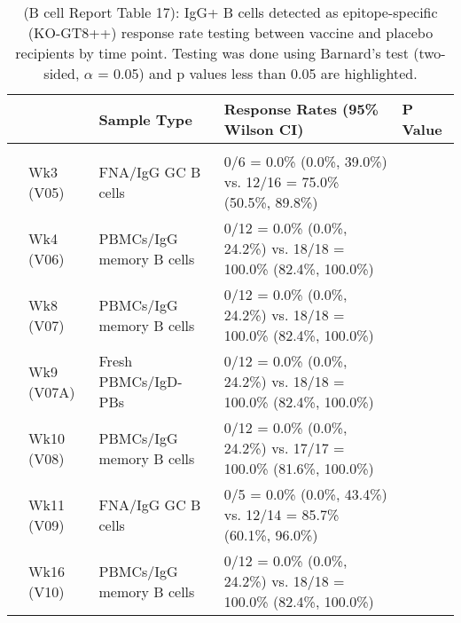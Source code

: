 \documentclass[
]{article}
\author{}
\date{\vspace{-2.5em}}
\begin{document}
\begin{table}[!h]

\caption[(B cell Report Table 17) IgG+ B cells detected as epitope-specific (KO-GT8++) response rate testing between vaccine and placebo recipients by time point]{\label{tab:bcell-tab-17}(B cell Report Table 17): IgG+ B cells detected as epitope-specific (KO-GT8++) response rate testing between vaccine and placebo recipients by time point. Testing was done using Barnard's test (two-sided, $\alpha$ = 0.05) and p values less than 0.05 are highlighted.}
\centering
\fontsize{7.5}{9.5}\selectfont
\begin{tabular}[t]{lllll}
\toprule
 &  & Sample Type & Response Rates (95\% Wilson CI) & P Value\\
\midrule
\addlinespace[0.3em]
\multicolumn{5}{l}{\textbf{Placebo vs. 20µg}}\\
\hspace{1em} & Wk3 (V05) & FNA/IgG GC B cells & 0/6 = 0.0\% (0.0\%, 39.0\%) vs. 12/16 = 75.0\% (50.5\%, 89.8\%) & \cellcolor{yellow}{0.0017}\\
\cmidrule{2-5}
\hspace{1em}\hspace{1em} & Wk4 (V06) & PBMCs/IgG memory B cells & 0/12 = 0.0\% (0.0\%, 24.2\%) vs. 18/18 = 100.0\% (82.4\%, 100.0\%) & \cellcolor{yellow}{<0.0001}\\
\cmidrule{2-5}
\hspace{1em} & Wk8 (V07) & PBMCs/IgG memory B cells & 0/12 = 0.0\% (0.0\%, 24.2\%) vs. 18/18 = 100.0\% (82.4\%, 100.0\%) & \cellcolor{yellow}{<0.0001}\\
\cmidrule{2-5}
\hspace{1em} & Wk9 (V07A) & Fresh PBMCs/IgD- PBs & 0/12 = 0.0\% (0.0\%, 24.2\%) vs. 18/18 = 100.0\% (82.4\%, 100.0\%) & \cellcolor{yellow}{<0.0001}\\
\cmidrule{2-5}
\hspace{1em}\hspace{1em} & Wk10 (V08) & PBMCs/IgG memory B cells & 0/12 = 0.0\% (0.0\%, 24.2\%) vs. 17/17 = 100.0\% (81.6\%, 100.0\%) & \cellcolor{yellow}{<0.0001}\\
\cmidrule{2-5}
\hspace{1em} & Wk11 (V09) & FNA/IgG GC B cells & 0/5 = 0.0\% (0.0\%, 43.4\%) vs. 12/14 = 85.7\% (60.1\%, 96.0\%) & \cellcolor{yellow}{0.0006}\\
\cmidrule{2-5}
\hspace{1em} & Wk16 (V10) & PBMCs/IgG memory B cells & 0/12 = 0.0\% (0.0\%, 24.2\%) vs. 18/18 = 100.0\% (82.4\%, 100.0\%) & \cellcolor{yellow}{<0.0001}\\

\end{tabular}
\end{table}
\end{document}
